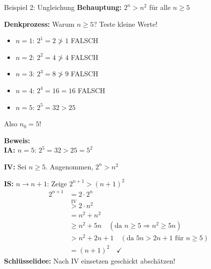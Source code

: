 \documentclass[a4paper, fontsize=7pt]{scrartcl}
\begin{document}
\begin{subbox}{Beispiel 2: Ungleichung}
\textbf{Behauptung:} $2^n > n^2$ für alle $n \geq 5$

\textbf{Denkprozess:} Warum $n \geq 5$? Teste kleine Werte!
\begin{itemize}
  \item $n=1$: $2^1 = 2 \not> 1$ \quad FALSCH
  \item $n=2$: $2^2 = 4 \not> 4$ \quad FALSCH
  \item $n=3$: $2^3 = 8 \not> 9$ \quad FALSCH
  \item $n=4$: $2^4 = 16 = 16$ \quad FALSCH
  \item $n=5$: $2^5 = 32 > 25$ \quad \checkmark
\end{itemize}
Also $n_0 = 5$!

\textbf{Beweis:}\\
\textbf{IA:} $n=5$: $2^5 = 32 > 25 = 5^2$ \checkmark

\textbf{IV:} Sei $n \geq 5$. Angenommen, $2^n > n^2$

\textbf{IS:} $n \to n+1$: Zeige $2^{n+1} > (n+1)^2$
\begin{align*}
2^{n+1} &= 2 \cdot 2^n\\
&\stackrel{\text{IV}}{>} 2 \cdot n^2\\
&= n^2 + n^2\\
&\geq n^2 + 5n \quad (\text{da } n \geq 5 \Rightarrow n^2 \geq 5n)\\
&> n^2 + 2n + 1 \quad (\text{da } 5n > 2n+1 \text{ für } n \geq 5)\\
&= (n+1)^2 \quad \checkmark
\end{align*}
\textbf{Schlüsselidee:} Nach IV einsetzen geschickt abschätzen!
\end{subbox}
\end{document}
